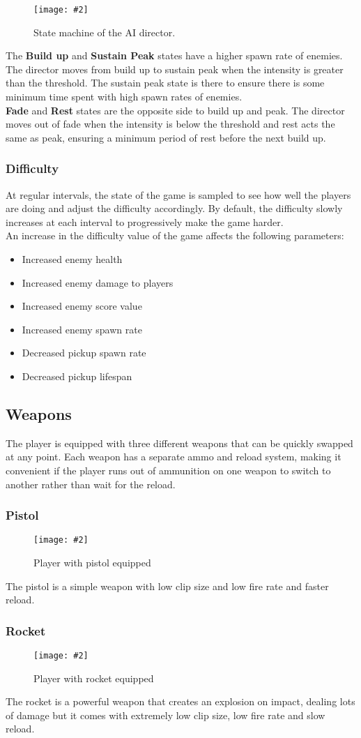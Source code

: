 \documentclass{article}
\newcommand{\n}[0]{\\[\baselineskip]}
\newcommand{\figimg}[3]{
  \begin{figure}[H]
    \centering
    \texttt{[image: \#2]}
    \caption{#3}
  \end{figure}
  \noindent 
}
\begin{document}
\figimg{0.7}{imgs/DirectorFSM.png}{State machine of the AI director.}
The \textbf{Build up} and \textbf{Sustain Peak} states have a higher spawn rate of enemies. The director moves from build up to sustain peak when the intensity is greater than the threshold. The sustain peak state is there to ensure there is some minimum time spent with high spawn rates of enemies. 
\n
\textbf{Fade} and \textbf{Rest} states are the opposite side to build up and peak. The director moves out of fade when the intensity is below the threshold and rest acts the same as peak, ensuring a minimum period of rest before the next build up.
\subsubsection{Difficulty}
At regular intervals, the state of the game is sampled to see how well the players are doing and adjust the difficulty accordingly. By default, the difficulty slowly increases at each interval to progressively make the game harder.
\n
An increase in the difficulty value of the game affects the following parameters:
\begin{itemize}
\item Increased enemy health
\item Increased enemy damage to players
\item Increased enemy score value
\item Increased enemy spawn rate
\item Decreased pickup spawn rate
\item Decreased pickup lifespan
\end{itemize}

\subsection{Weapons}
The player is equipped with three different weapons that can be quickly swapped at any point. Each weapon has a separate ammo and reload system, making it convenient if the player runs out of ammunition on one weapon to switch to another rather than wait for the reload.
\subsubsection{Pistol}
\figimg{0.1}{imgs/Gun.png}{Player with pistol equipped}
The pistol is a simple weapon with low clip size and low fire rate and faster reload.

\subsubsection{Rocket}
\figimg{0.1}{imgs/Rocket.png}{Player with rocket equipped}
The rocket is a powerful weapon that creates an explosion on impact, dealing lots of damage but it comes with extremely low clip size, low fire rate and slow reload.
\end{document}
